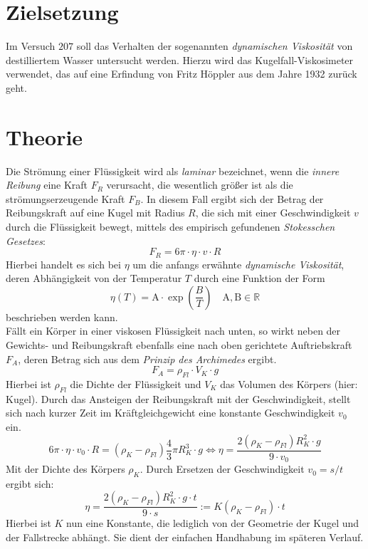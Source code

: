 \section*{Zielsetzung}
Im Versuch $207$ soll das Verhalten der sogenannten \emph{dynamischen Viskosität} von destilliertem Wasser untersucht werden. Hierzu wird das Kugelfall-Viskosimeter verwendet,
das auf eine Erfindung von Fritz Höppler aus dem Jahre 1932 zurück geht.

\section{Theorie}
Die Strömung einer Flüssigkeit wird als \emph{laminar} bezeichnet, wenn die \emph{innere Reibung} eine Kraft $F_R$ verursacht, die wesentlich größer ist
als die strömungserzeugende Kraft $F_B$. In diesem Fall ergibt sich der Betrag der Reibungskraft auf eine Kugel mit Radius $R$, die sich mit einer Geschwindigkeit
$v$ durch die Flüssigkeit bewegt, mittels des empirisch gefundenen \emph{Stokesschen Gesetzes}:
\begin{equation}
  F_R = 6 \pi \cdot \eta \cdot v \cdot R
  \label{eq: stokes}
\end{equation}
Hierbei handelt es sich bei $\eta$ um die anfangs erwähnte \emph{dynamische Viskosität}, deren Abhängigkeit von der Temperatur $T$ durch eine Funktion der Form
\begin{equation}
  \eta(T) = \mathup{A} \cdot \exp(\frac{B}{T}) \quad \mathup{A}, \mathup{B} \in \mathbb{R}
  \label{eq: andrad}
\end{equation}
beschrieben werden kann. \\
Fällt ein Körper in einer viskosen Flüssigkeit nach unten, so wirkt neben der Gewichts- und Reibungskraft ebenfalls eine nach oben gerichtete Auftriebskraft $F_A$, deren
Betrag sich aus dem \emph{Prinzip des Archimedes} ergibt.
\begin{equation}
  F_A = \rho_{Fl} \cdot V_K \cdot g
\end{equation}
Hierbei ist $\rho_{Fl}$ die Dichte der Flüssigkeit und $V_K$ das Volumen des Körpers (hier: Kugel). Durch das Ansteigen der Reibungskraft mit der Geschwindigkeit,
stellt sich nach kurzer Zeit im Kräftgleichgewicht eine konstante Geschwindigkeit $v_0$ ein.
\begin{equation}
  6 \pi \cdot \eta \cdot v_0 \cdot R  = (\rho_K - \rho_{Fl})\frac{4}{3}\pi R_K^3 \cdot g  \Leftrightarrow \eta = \frac{2 (\rho_K - \rho_{Fl}) R_K^2\cdot  g}{9\cdot v_0}
\end{equation}
Mit der Dichte des Körpers $\rho_K$. Durch Ersetzen der Geschwindigkeit $v_0 = s / t$ ergibt sich:
\begin{equation}
  \eta = \frac{2 (\rho_K - \rho_{Fl}) R_K^2\cdot  g \cdot t}{9\cdot s} := K (\rho_K - \rho_{Fl}) \cdot t
  \label{eq: eta}
\end{equation}
Hierbei ist $K$ nun eine Konstante, die lediglich von der Geometrie der Kugel und der Fallstrecke abhängt. Sie dient der einfachen Handhabung im späteren Verlauf.\\

